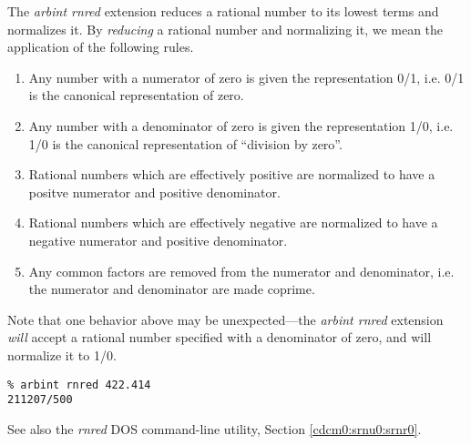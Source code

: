 \begin{tclcommandsynopsis}
\end{tclcommandsynopsis}

\begin{tclcommanddescription}
The \emph{arbint rnred} extension reduces a rational number to its lowest terms
and normalizes it.  By \emph{reducing} a rational number and
normalizing it, we mean the application of the following rules.

\begin{enumerate}
\item Any number with a numerator of zero is given the
      representation 0/1, i.e. 0/1 is the canonical 
	  representation of zero.
\item Any number with a denominator of zero is given
      the representation 1/0, i.e. 1/0 is the canonical
	  representation of ``division by zero''.
\item Rational numbers which are effectively positive
      are normalized to have a positve numerator and positive
	  denominator.
\item Rational numbers which are effectively negative are
      normalized to have a negative numerator and positive
	  denominator.
\item Any common factors are removed from the numerator and
      denominator, i.e. the numerator and denominator are
	  made coprime.
\end{enumerate}

Note that one behavior above may be unexpected---the
\emph{arbint rnred} extension \emph{will} accept a rational number
specified with a denominator of zero, and will normalize it to
1/0.
\end{tclcommanddescription}

\begin{tclcommandsampleinvocations}
\begin{scriptsize}
\begin{verbatim}
% arbint rnred 422.414
211207/500
\end{verbatim}
\end{scriptsize}
\end{tclcommandsampleinvocations}

\begin{tclcommandseealso}
See also the \emph{rnred} DOS command-line utility, 
Section \cdcmzeroxrefhyphen{}\ref{cdcm0:srnu0:srnr0}.
\end{tclcommandseealso}

